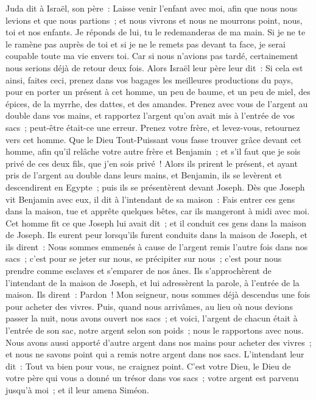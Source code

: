 \begin{multicols}{2}
Juda dit à Israël, son père~: Laisse venir l'enfant avec moi, afin que nous nous levions et que nous partions~; et nous vivrons et nous ne mourrons point, nous, toi et nos enfants.
Je réponds de lui, tu le redemanderas de ma main. Si je ne te le ramène pas auprès de toi et si je ne le remets pas devant ta face, je serai coupable toute ma vie envers toi.
Car si nous n'avions pas tardé, certainement nous serions déjà de retour deux fois.
Alors Israël leur père leur dit~: Si cela est ainsi, faites ceci, prenez dans vos bagages les meilleures productions du pays, pour en porter un présent à cet homme, un peu de baume, et un peu de miel, des épices, de la myrrhe, des dattes, et des amandes.
Prenez avec vous de l'argent au double dans vos mains, et rapportez l'argent qu'on avait mis à l'entrée de vos sacs~; peut-être était-ce une erreur.
Prenez votre frère, et levez-vous, retournez vers cet homme.
Que le Dieu Tout-Puissant vous fasse trouver grâce devant cet homme, afin qu'il relâche votre autre frère et Benjamin~; et s'il faut que je sois privé de ces deux fils, que j'en sois privé~!
Alors ils prirent le présent, et ayant pris de l'argent au double dans leurs mains, et Benjamin, ils se levèrent et descendirent en Egypte~; puis ils se présentèrent devant Joseph.
Dès que Joseph vit Benjamin avec eux, il dit à l'intendant de sa maison~: Fais entrer ces gens dans la maison, tue et apprête quelques bêtes, car ils mangeront à midi avec moi.
Cet homme fit ce que Joseph lui avait dit~; et il conduit ces gens dans la maison de Joseph.
Ils eurent peur lorsqu'ils furent conduits dans la maison de Joseph, et ils dirent~: Nous sommes emmenés à cause de l'argent remis l'autre fois dans nos sacs~; c'est pour se jeter sur nous, se précipiter sur nous~; c'est pour nous prendre comme esclaves et s'emparer de nos ânes.
Ils s'approchèrent de l'intendant de la maison de Joseph, et lui adressèrent la parole, à l'entrée de la maison.
Ils dirent~: Pardon~! Mon seigneur, nous sommes déjà descendus une fois pour acheter des vivres.
Puis, quand nous arrivâmes, au lieu où nous devions passer la nuit, nous avons ouvert nos sacs~; et voici, l'argent de chacun était à l'entrée de son sac, notre argent selon son poids~; nous le rapportons avec nous.
Nous avons aussi apporté d'autre argent dans nos mains pour acheter des vivres~; et nous ne savons point qui a remis notre argent dans nos sacs.
L'intendant leur dit~: Tout va bien pour vous, ne craignez point. C'est votre Dieu, le Dieu de votre père qui vous a donné un trésor dans vos sacs~; votre argent est parvenu jusqu'à moi~; et il leur amena Siméon.

\end{multicols}
